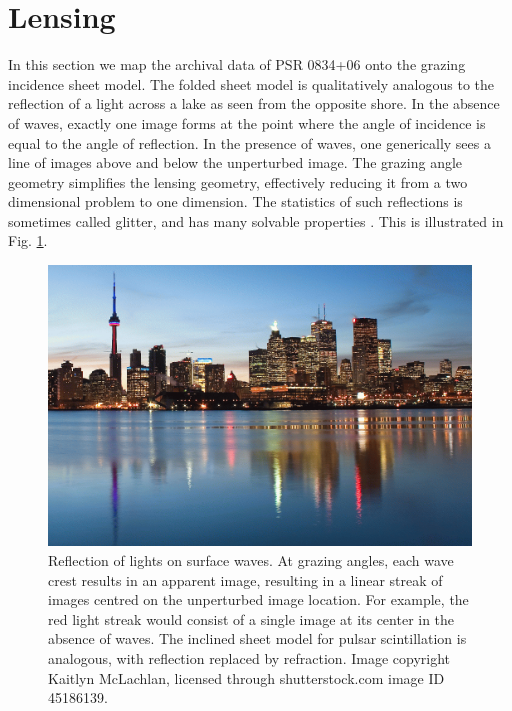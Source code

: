 \documentclass[useAMS,usenatbib]{mn2e}
\begin{document}
\section{Lensing}

In this section we map the archival data of PSR 0834+06 onto the grazing incidence sheet
model.  The folded sheet model is qualitatively analogous to the
reflection of a light across a lake as seen from the opposite
shore.
In the absence of waves, exactly one image forms at the point
where the angle of incidence is equal to the angle of reflection.  In
the presence of waves, one generically sees a line of images above and
below the unperturbed image.  The grazing angle geometry simplifies
the lensing geometry, effectively reducing it from a two dimensional problem to
one dimension.  The statistics of such reflections is sometimes called
glitter, and has many solvable
properties \citep{LonguetHiggins1960}.  This is illustrated in
Fig. \ref{fig:water_reflection}.



\begin{figure}
\centering
\includegraphics[width=1.0\linewidth, angle=0]{toronto-skyline.png}
\caption{Reflection of lights on surface waves.  At grazing angles,
 each wave crest results in an apparent image, resulting in a linear
 streak of images centred on the unperturbed image location.  For
 example, the red light streak would consist of a single image at its
 center in the absence of waves. The inclined sheet model for  pulsar
 scintillation is analogous, with reflection replaced by refraction.
Image copyright Kaitlyn McLachlan,
 licensed through shutterstock.com image ID 45186139.}
\label{fig:water_reflection}
\end{figure}
\end{document}
